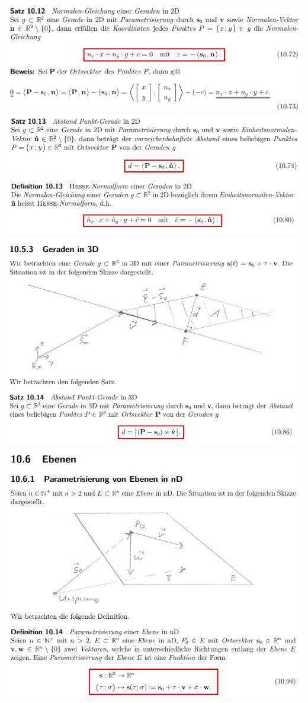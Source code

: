 \includegraphics[width=\columnwidth]{./images/vek26.png}
\includegraphics[width=\columnwidth]{./images/vek27.png}
\includegraphics[width=\columnwidth]{./images/vek28.png}
\includegraphics[width=\columnwidth]{./images/vek29.png}
\includegraphics[width=\columnwidth]{./images/vek30.png}
